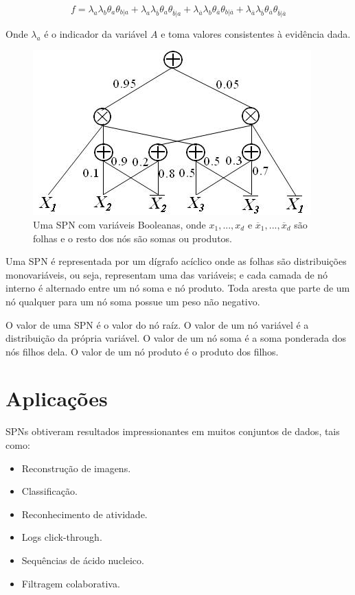 \documentclass[a4paper,10pt]{article}
\theoremstyle{plain}
\begin{document}
\begin{equation*}
  f = \lambda_a\lambda_b\theta_a\theta_{b|a} +
  \lambda_a\lambda_{\overline{b}}\theta_a\theta_{\overline{b}|a} +
  \lambda_{\overline{a}}\lambda_b\theta_{\overline{a}}\theta_{b|\overline{a}} +
  \lambda_{\overline{a}}\lambda_{\overline{b}}\theta_{\overline{a}}\theta_{\overline{b}|\overline{a}}
\end{equation*}

Onde $\lambda_{a}$ é o indicador da variável $A$ e toma valores consistentes à evidência dada.

\begin{figure}[h]
  \centering\includegraphics[scale=0.7]{imgs/domingos_poon.jpg}
  \caption{Uma SPN com variáveis Booleanas, onde $x_1,...,x_d$ e $\overline{x}_1,...,\overline{x}_d
  $ são folhas e o resto dos nós são somas ou produtos.\cite{poon-domingos}}
\end{figure}

Uma SPN é representada por um dígrafo acíclico onde as folhas são distribuições monovariáveis, ou
seja, representam uma das variáveis; e cada camada de nó interno é alternado entre um nó soma e nó
produto. Toda aresta que parte de um nó qualquer para um nó soma possue um peso não negativo.

O valor de uma SPN é o valor do nó raíz. O valor de um nó variável é a distribuição da própria
variável. O valor de um nó soma é a soma ponderada dos nós filhos dela. O valor de um nó produto
é o produto dos filhos.

\section{Aplicações}

SPNs obtiveram resultados impressionantes em muitos conjuntos de dados\cite{website:spn-uwashington}, tais como:

\begin{itemize} \itemsep0pt
  \item Reconstrução de imagens.
  \item Classificação.
  \item Reconhecimento de atividade.
  \item Logs click-through.
  \item Sequências de ácido nucleico.
  \item Filtragem colaborativa.
\end{itemize}
\end{document}
